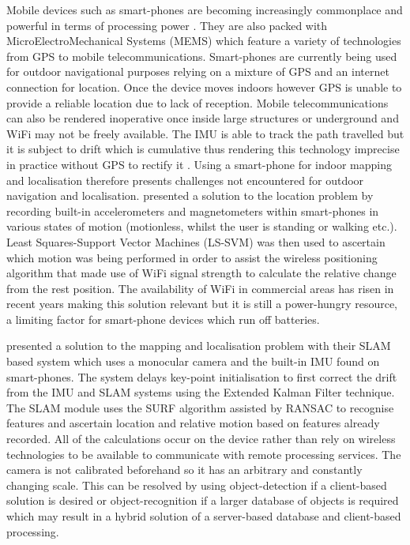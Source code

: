 Mobile devices such as smart-phones are becoming increasingly commonplace \citep{goldstein_report:_2014} and powerful in terms of processing power \citep{ye_smartphone_2015}. They are also packed with MicroElectroMechanical Systems (MEMS) which feature a variety of technologies from GPS to mobile telecommunications. Smart-phones are currently being used for outdoor navigational purposes relying on a mixture of GPS and an internet connection for location. Once the device moves indoors however GPS is unable to provide a reliable location due to lack of reception. Mobile telecommunications can also be rendered inoperative once inside large structures or underground and WiFi may not be freely available. The IMU is able to track the path travelled but it is subject to drift which is cumulative thus rendering this technology imprecise in practice without GPS to rectify it \citep{david_sachs_sensor_2010}. 
\newpage
Using a smart-phone for indoor mapping and localisation therefore presents challenges not encountered for outdoor navigation and localisation. \citet{pei_using_2012} presented a solution to the location problem by recording built-in accelerometers and magnetometers within smart-phones in various states of motion (motionless, whilst the user is standing or walking etc.). Least Squares-Support Vector Machines (LS-SVM) was then used to ascertain which motion was being performed in order to assist the wireless positioning algorithm that made use of WiFi signal strength to calculate the relative change from the rest position. The availability of WiFi in commercial areas has risen in recent years \citep{wakefield_one_2014} making this solution relevant but it is still a power-hungry resource, a limiting factor for smart-phone devices which run off batteries. 

\citet{mostofi_indoor_2014} presented a solution to the mapping and localisation problem with their SLAM based system which uses a monocular camera and the built-in IMU found on smart-phones. The system delays key-point initialisation to first correct the drift from the IMU and SLAM systems using the Extended Kalman Filter technique. The SLAM module uses the SURF algorithm assisted by RANSAC to recognise features and ascertain location and relative motion based on features already recorded. All of the calculations occur on the device rather than rely on wireless technologies to be available to communicate with remote processing services. The camera is not calibrated beforehand so it has an arbitrary and constantly changing scale. This can be resolved by using object-detection if a client-based solution is desired or object-recognition if a larger database of objects is required which may result in a hybrid solution of a server-based database and client-based processing.

